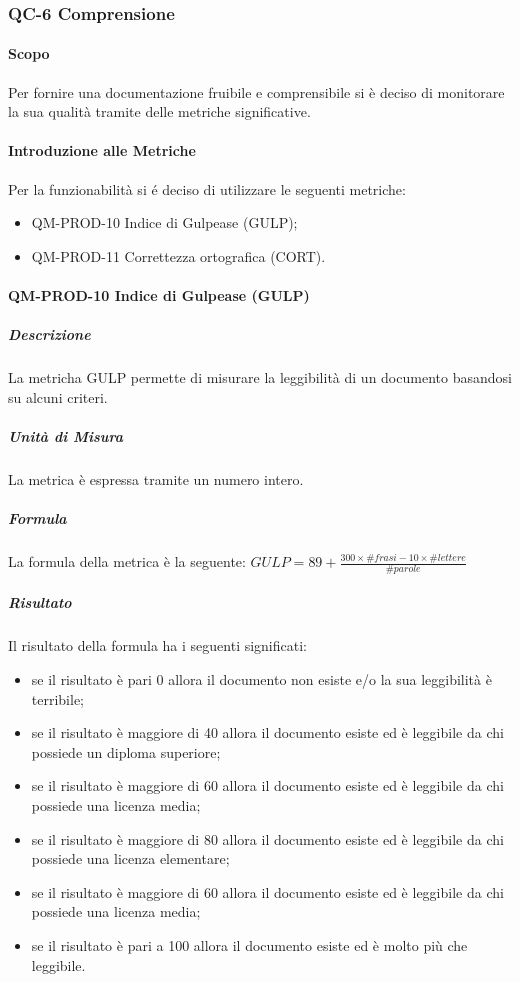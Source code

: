 	\subsubsection{QC-6 Comprensione}
		\paragraph{Scopo}
			Per fornire una documentazione fruibile e comprensibile si è deciso di monitorare la sua qualità tramite delle metriche significative.
		\paragraph{Introduzione alle Metriche}
			Per la funzionabilità si é deciso di utilizzare le seguenti metriche:
			\begin{itemize}
				\item QM-PROD-10 Indice di Gulpease (GULP);
				\item QM-PROD-11 Correttezza ortografica (CORT).
			\end{itemize}
		\paragraph{QM-PROD-10 Indice di Gulpease (GULP)}
			\subparagraph{Descrizione}
				La metricha GULP permette di misurare la leggibilità di un documento basandosi su alcuni criteri.
			\subparagraph{Unità di Misura}
				La metrica è espressa tramite un numero intero.
			\subparagraph{Formula}
				La formula della metrica è la seguente:
				\(
					GULP = 89+\frac{300\times\# frasi-10\times\#lettere}{\#parole}
				\)
			\subparagraph{Risultato}
				Il risultato della formula ha i seguenti significati:
				\begin{itemize}
					\item se il risultato è pari 0 allora il documento non esiste e/o la sua leggibilità è terribile;
					\item se il risultato è maggiore di 40 allora il documento esiste ed è leggibile da chi possiede un diploma superiore;
					\item se il risultato è maggiore di 60 allora il documento esiste ed è leggibile da chi possiede una licenza media;
					\item se il risultato è maggiore di 80 allora il documento esiste ed è leggibile da chi possiede una licenza elementare;
					\item se il risultato è maggiore di 60 allora il documento esiste ed è leggibile da chi possiede una licenza media;
					\item se il risultato è pari a 100 allora il documento esiste ed è molto più che leggibile.
				\end{itemize}
